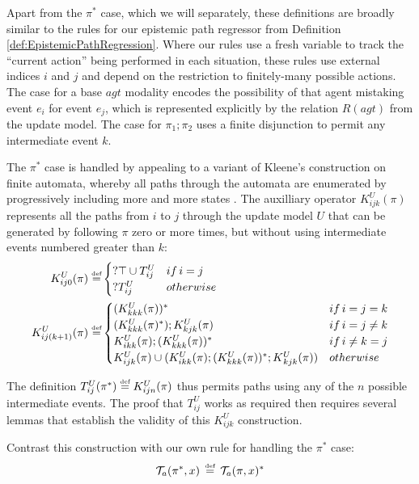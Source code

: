 Apart from the $\pi^{*}$ case, which we will separately, these definitions
are broadly similar to the rules for our epistemic path regressor
from Definition \ref{def:EpistemicPathRegression}. Where our rules
use a fresh variable to track the {}``current action'' being performed
in each situation, these rules use external indices $i$ and $j$
and depend on the restriction to finitely-many possible actions. The
case for a base $agt$ modality encodes the possibility of that agent
mistaking event $e_{i}$ for event $e_{j}$, which is represented
explicitly by the relation $R(agt)$ from the update model. The case
for $\pi_{1};\pi_{2}$ uses a finite disjunction to permit any intermediate
event $k$.

The $\pi^{*}$ case is handled by appealing to a variant of Kleene's
construction on finite automata, whereby all paths through the automata
are enumerated by progressively including more and more states \citep[ Theorem 2.5.1]{lewis81theory_of_computation}.
The auxilliary operator $K_{ijk}^{U}(\pi)$ represents all the paths
from $i$ to $j$ through the update model $U$ that can be generated
by following $\pi$ zero or more times, but without using intermediate
events numbered greater than $k$:\begin{align*}
K_{ij0}^{U}(\pi)\stackrel{\mbox{\tiny def}}{=} & \begin{cases}
?\top\cup T_{ij}^{U} & if\, i=j\\
?T_{ij}^{U} & otherwise\end{cases}\\
K_{ij(k+1)}^{U}(\pi)\stackrel{\mbox{\tiny def}}{=} & \begin{cases}
(K_{kkk}^{U}(\pi))^{*} & if\, i=j=k\\
(K_{kkk}^{U}(\pi)^{*});K_{kjk}^{U}(\pi) & if\, i=j\neq k\\
K_{ikk}^{U}(\pi);(K_{kkk}^{U}(\pi))^{*} & if\, i\neq k=j\\
K_{ijk}^{U}(\pi)\cup(K_{ikk}^{U}(\pi);(K_{kkk}^{U}(\pi))^{*};K{}_{kjk}^{U}(\pi)) & otherwise\end{cases}\end{align*}


The definition $T_{ij}^{U}(\pi^{*})\stackrel{\mbox{\tiny def}}{=} K_{ijn}^{U}(\pi)$ thus
permits paths using any of the $n$ possible intermediate events.
The proof that $T_{ij}^{U}$ works as required then requires several
lemmas that establish the validity of this $K_{ijk}^{U}$ construction.

Contrast this construction with our own rule for handling the $\pi^{*}$
case:\[
\mathcal{T}_{a}(\pi^{*},x)\,\stackrel{\mbox{\tiny def}}{=}\,\mathcal{T}_{a}(\pi,x)^{*}\]


